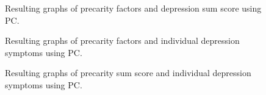 \documentclass[
]{article}
\begin{document}
\begin{figure}
\begin{minipage}{0.50\linewidth}
{}


\end{minipage}%

\caption{\label{fig-pc_sum}Resulting graphs of precarity factors and
depression sum score using PC.}

\end{figure}%

\begin{figure}


\caption{\label{fig-pc_sym}Resulting graphs of precarity factors and
individual depression symptoms using PC.}

\end{figure}%

\begin{figure}


\caption{\label{fig-pc_presum}Resulting graphs of precarity sum score
and individual depression symptoms using PC.}

\end{figure}%
\end{document}
